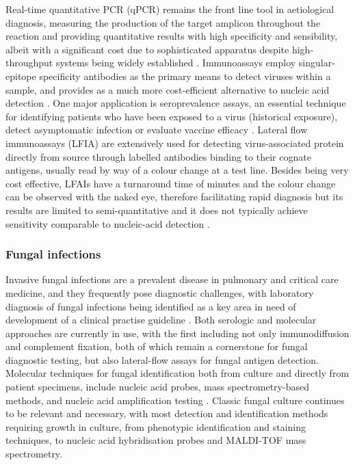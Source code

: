 Real-time quantitative PCR (qPCR) remains the front line tool in aetiological diagnosis, measuring the production of the target amplicon throughout the reaction and providing quantitative results with high specificity and sensibility, albeit with a significant cost due to sophisticated apparatus despite high-throughput systems being widely established \citep{cassedy_virus_2021}. Immunoassays employ singular-epitope specificity antibodies as the primary means to detect viruses within a sample, and provides as a much more cost-efficient alternative to nucleic acid detection \citep{cassedy_virus_2021}. One major application is seroprevalence assays, an essential technique for identifying patients who have been exposed to a virus (historical exposure), detect asymptomatic infection or evaluate vaccine efficacy  \citep{chan_determining_2021, bobrovitz_global_2021}. Lateral flow immunoassays (LFIA) are extensively used for detecting virus-associated protein directly from source through labelled antibodies binding to their cognate antigens, usually read by way of a colour change at a test line. Besides being very cost effective, LFAIs have a turnaround time of minutes and the colour change can be observed with the naked eye, therefore facilitating rapid diagnosis but its results are limited to semi-quantitative and it does not typically achieve sensitivity comparable to nucleic-acid detection \citep{estrela_lateral_2016, cassedy_virus_2021, di_nardo_ten_2021}.

\subsubsection{Fungal infections}

Invasive fungal infections are a prevalent disease in pulmonary and critical care medicine, and they frequently pose diagnostic challenges, with laboratory diagnosis of fungal infections being identified as a key area in need of development of a clinical practise guideline \citep{haydour_diagnosis_2019}. Both serologic and molecular approaches are currently in use, with the first including not only immunodiffusion and complement fixation, both of which remain a cornerstone for fungal diagnostic testing, but also lateral-flow assays for fungal antigen detection. Molecular techniques for fungal identification both from culture and directly from patient specimens, include nucleic acid probes, mass spectrometry-based methods, and nucleic acid amplification testing \citep{ramanan_laboratory_2017}. Classic fungal culture continues to be relevant and necessary, with most detection and identification methods requiring growth in culture, from phenotypic identification and staining techniques, to nucleic acid hybridisation probes and MALDI-TOF mass spectrometry.  

